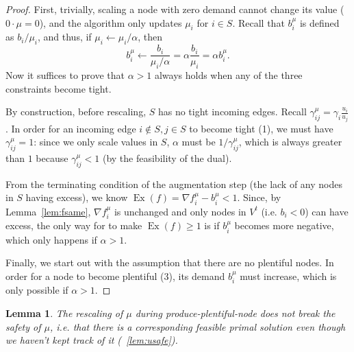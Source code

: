 \documentclass[11pt]{article}
\newtheorem{lemma}[theorem]{Lemma}
\theoremstyle{definition}
\theoremstyle{definition}
\newcommand{\fu}{f^{\mu}}
\newcommand{\nfiu}{\nabla \fu_i}
\newcommand{\biu}{b_{i}^{\mu}}
\newcommand{\giij}{\gamma_{ij}^{\mu}}
\newcommand{\vsrc}{V^{t}}
\DeclareMathOperator{\Ex}{Ex}
\begin{document}
\begin{proof}
	First, trivially, scaling a node with zero demand cannot change its value
	($0\cdot\mu=0$), and the algorithm only updates $\mu_i$ for $i \in S$. Recall
	that $\biu$ is defined as $b_i / \mu_i$, and thus, if $\mu_i\leftarrow \mu_i / \alpha$,
	then
	\[ \biu \leftarrow \frac{b_i}{\mu_i / \alpha} = \alpha\frac{b_i}{\mu_i} = \alpha \biu. \] 
	Now it suffices to prove that $\alpha > 1$ always holds when any of the three
	constraints become tight.
	
	By construction, before rescaling, $S$ has no tight
	incoming edges. Recall $\giij = \gamma_i\frac{u_i}{u_j}$. In order for an
	incoming edge $i \notin S, j\in S$ to become tight (1), we must have $\giij=1$:
	since we only scale values in $S$, $\alpha$ must be ${1}/{\giij}$, which is
	always greater than $1$ because $\giij < 1$ (by the feasibility of the dual).

	From the terminating condition of the augmentation step (the lack of any nodes
	in $S$ having excess), we know $\Ex(f) = \nfiu - \biu < 1$. Since, by
	Lemma~\ref{lem:fsame}, $\nfiu$ is unchanged and only nodes in $\vsrc$ (i.e. $b_i<0$)
	can have excess, the only way for to make $\Ex(f) \ge 1$ is if $\biu$ becomes
	more negative, which only happens if $\alpha > 1$. 
	
	Finally, we start out with the assumption that there are no plentiful nodes.
	In order for a node to become plentiful (3), its demand $\biu$ must increase,
	which is only possible if $\alpha > 1$.
\end{proof}
\begin{lemma}
	The rescaling of $\mu$ during produce-plentiful-node does not break 
	the safety of $\mu$, i.e. that there is a corresponding feasible primal
	solution even though we haven't kept track of it (~\ref{lem:usafe}).
\end{lemma}
\end{document}
